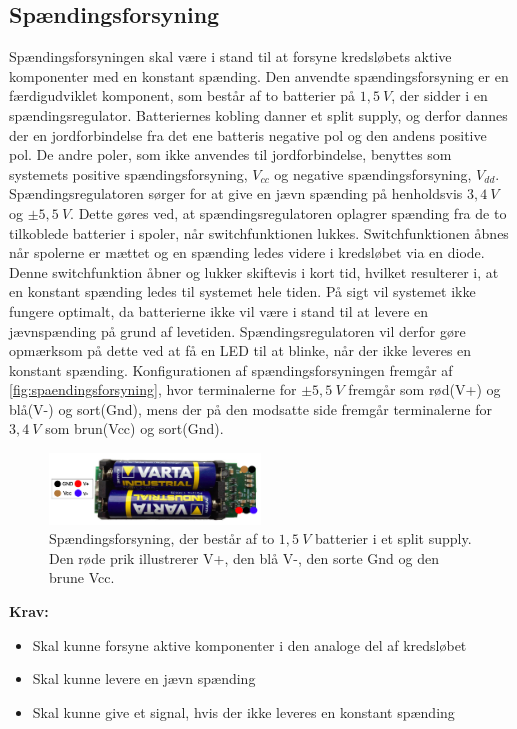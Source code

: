 \subsection{Spændingsforsyning}
Spændingsforsyningen skal være i stand til at forsyne kredsløbets aktive komponenter med en konstant spænding. Den anvendte spændingsforsyning er en færdigudviklet komponent, som består af to batterier på $1,5~V$, der sidder i en spændingsregulator. Batteriernes kobling danner et split supply, og derfor dannes der en jordforbindelse fra det ene batteris negative pol og den andens positive pol. De andre poler, som ikke anvendes til jordforbindelse, benyttes som systemets positive spændingsforsyning, ${V}_{cc}$ og negative spændingsforsyning, ${V}_{dd}$.
Spændingsregulatoren sørger for at give en jævn spænding på henholdsvis $3,4~V$ og $\pm 5,5~V$. Dette gøres ved, at spændingsregulatoren oplagrer spænding fra de to tilkoblede batterier i spoler, når switchfunktionen lukkes. Switchfunktionen åbnes når spolerne er mættet og en spænding ledes videre i kredsløbet via en diode. Denne switchfunktion åbner og lukker skiftevis i kort tid, hvilket resulterer i, at en konstant spænding ledes til systemet hele tiden. På sigt vil systemet ikke fungere optimalt, da batterierne ikke vil være i stand til at levere en jævnspænding på grund af levetiden. Spændingsregulatoren vil derfor gøre opmærksom på dette ved at få en LED til at blinke, når der ikke leveres en konstant spænding. 
Konfigurationen af spændingsforsyningen fremgår af \autoref{fig:spaendingsforsyning}, hvor terminalerne for $\pm 5,5~V$ fremgår som rød(V+) og blå(V-) og sort(Gnd), mens der på den modsatte side fremgår terminalerne for $3,4~V$ som brun(Vcc) og sort(Gnd). 

\begin{figure}[H]
\centering
\includegraphics[width=0.5\textwidth]{figures/spaendingsforsyning}
\caption{Spændingsforsyning, der består af to $1,5~V$ batterier i et split supply. Den røde prik illustrerer V+, den blå V-, den sorte Gnd og den brune Vcc.}
\label{fig:spaendingsforsyning}
\end{figure}

\textbf{Krav:}
\begin{itemize} 
\item Skal kunne forsyne aktive komponenter i den analoge del af kredsløbet
\item Skal kunne levere en jævn spænding
\item Skal kunne give et signal, hvis der ikke leveres en konstant spænding
\end{itemize}
